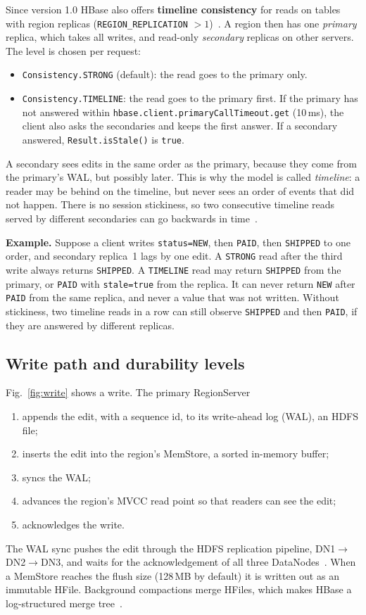 \documentclass[10pt,twocolumn,letterpaper]{article}
\newcommand{\code}[1]{\texttt{\small #1}}
\begin{document}
Since version 1.0 HBase also offers \textbf{timeline consistency} for reads on tables with region replicas (\code{REGION\_REPLICATION} $>1$)~\cite{timeline,hbase10070}. A region then has one \emph{primary} replica, which takes all writes, and read-only \emph{secondary} replicas on other servers. The level is chosen per request:
\begin{itemize}
\item \code{Consistency.STRONG} (default): the read goes to the primary only.
\item \code{Consistency.TIMELINE}: the read goes to the primary first. If the primary has not answered within \code{hbase.client.primaryCallTimeout.get} (10\,ms), the client also asks the secondaries and keeps the first answer. If a secondary answered, \code{Result.isStale()} is \code{true}.
\end{itemize}
A secondary sees edits in the same order as the primary, because they come from the primary's WAL, but possibly later. This is why the model is called \emph{timeline}: a reader may be behind on the timeline, but never sees an order of events that did not happen. There is no session stickiness, so two consecutive timeline reads served by different secondaries can go backwards in time~\cite{timeline}.

\textbf{Example.} Suppose a client writes \code{status=NEW}, then \code{PAID}, then \code{SHIPPED} to one order, and secondary replica~1 lags by one edit. A \code{STRONG} read after the third write always returns \code{SHIPPED}. A \code{TIMELINE} read may return \code{SHIPPED} from the primary, or \code{PAID} with \code{stale=true} from the replica. It can never return \code{NEW} after \code{PAID} from the same replica, and never a value that was not written. Without stickiness, two timeline reads in a row can still observe \code{SHIPPED} and then \code{PAID}, if they are answered by different replicas.

\subsection{Write path and durability levels}
Fig.~\ref{fig:write} shows a write. The primary RegionServer
\begin{enumerate}
\item appends the edit, with a sequence id, to its write-ahead log (WAL), an HDFS file;
\item inserts the edit into the region's MemStore, a sorted in-memory buffer;
\item syncs the WAL;
\item advances the region's MVCC read point so that readers can see the edit;
\item acknowledges the write.
\end{enumerate}
The WAL sync pushes the edit through the HDFS replication pipeline, DN1$\rightarrow$DN2$\rightarrow$DN3, and waits for the acknowledgement of all three DataNodes~\cite{hdfs}. When a MemStore reaches the flush size (128\,MB by default) it is written out as an immutable HFile. Background compactions merge HFiles, which makes HBase a log-structured merge tree~\cite{lsm}.
\end{document}
